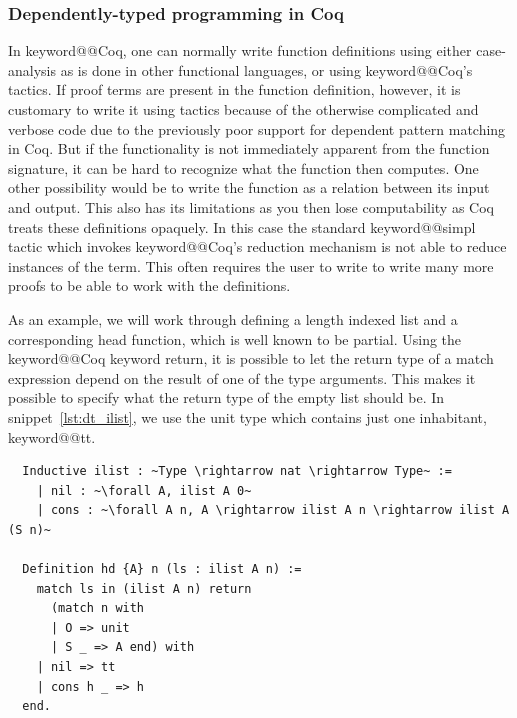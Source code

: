\documentclass[12pt, final]{article}
\makeatletter
\def\<#1>{\csname keyword@@#1\endcsname}
\makeatother
\begin{document}
\subsubsection{Dependently-typed programming in Coq}

In \<Coq>, one can normally write function definitions using either case-analysis as is done in other functional languages, or using \<Coq>'s tactics.
If proof terms are present in the function definition, however, it is customary to write it using tactics because of the otherwise complicated and verbose code due to the previously poor support for dependent pattern matching in Coq.
But if the functionality is not immediately apparent from the function signature, it can be hard to recognize what the function then computes.
One other possibility would be to write the function as a relation between its input and output.
This also has its limitations as you then lose computability as Coq treats these definitions opaquely. In this case the standard \<simpl> tactic which invokes \<Coq>'s reduction mechanism is not able to reduce instances of the term.
This often requires the user to write to write many more proofs to be able to work with the definitions.

As an example, we will work through defining a length indexed list and a corresponding head function, which is well known to be partial.
Using the \<Coq> keyword return, it is possible to let the return type of a match expression depend on the result of one of the type arguments.
This makes it possible to specify what the return type of the empty list should be.
In snippet~\ref{lst:dt_ilist}, we use the unit type which contains just one inhabitant, \<tt>.

\begin{listing}
  \begin{verbatim}
  Inductive ilist : ~Type \rightarrow nat \rightarrow Type~ :=
    | nil : ~\forall A, ilist A 0~
    | cons : ~\forall A n, A \rightarrow ilist A n \rightarrow ilist A (S n)~

  Definition hd {A} n (ls : ilist A n) :=
    match ls in (ilist A n) return
      (match n with
      | O => unit
      | S _ => A end) with
    | nil => tt
    | cons h _ => h
  end.
  \end{verbatim}
  \caption{Definition of a length indexed list and hd using the return keyword, adapted from Certified Programming with Dependent Types\cite{ChlipalaCPDT}.}
  \label{lst:dt_ilist}
\end{listing}
\end{document}

